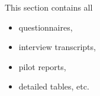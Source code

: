 \cleardoublepage  %
\label{cha:Appendices}      %

This section contains all
\begin{itemize}
	\item questionnaires,
	\item interview transcripts,
	\item pilot reports,
	\item detailed tables, etc.
\end{itemize}

